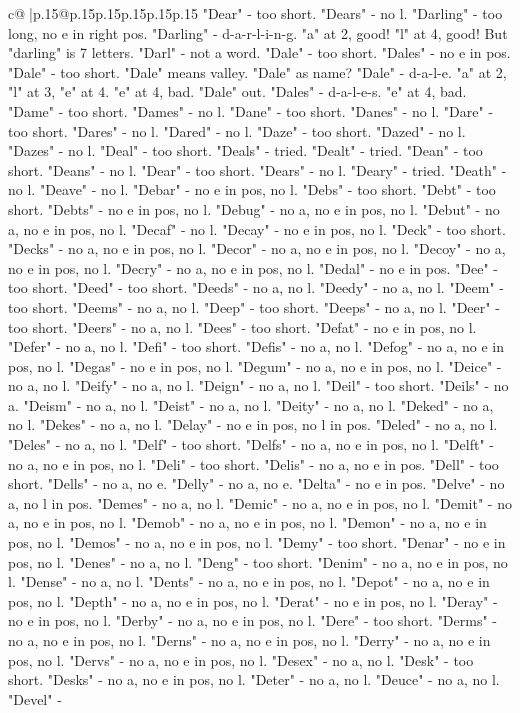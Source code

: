 \documentclass{article}
\begin{document}
{\begin{supertabular}{c@{$\;$}|p{.15\linewidth}@{}p{.15\linewidth}p{.15\linewidth}p{.15\linewidth}p{.15\linewidth}p{.15\linewidth}}
{{{"Dear" {-} too short. "Dears" {-} no l. "Darling" {-} too long, no e in right pos. "Darling" {-} d{-}a{-}r{-}l{-}i{-}n{-}g. "a" at 2, good! "l" at 4, good! But "darling" is 7 letters. "Darl" {-} not a word. "Dale" {-} too short. "Dales" {-} no e in pos. "Dale" {-} too short. "Dale" means valley. "Dale" as name? "Dale" {-} d{-}a{-}l{-}e. "a" at 2, "l" at 3, "e" at 4. "e" at 4, bad. "Dale" out. "Dales" {-} d{-}a{-}l{-}e{-}s. "e" at 4, bad. "Dame" {-} too short. "Dames" {-} no l. "Dane" {-} too short. "Danes" {-} no l. "Dare" {-} too short. "Dares" {-} no l. "Dared" {-} no l. "Daze" {-} too short. "Dazed" {-} no l. "Dazes" {-} no l. "Deal" {-} too short. "Deals" {-} tried. "Dealt" {-} tried. "Dean" {-} too short. "Deans" {-} no l. "Dear" {-} too short. "Dears" {-} no l. "Deary" {-} tried. "Death" {-} no l. "Deave" {-} no l. "Debar" {-} no e in pos, no l. "Debs" {-} too short. "Debt" {-} too short. "Debts" {-} no e in pos, no l. "Debug" {-} no a, no e in pos, no l. "Debut" {-} no a, no e in pos, no l. "Decaf" {-} no l. "Decay" {-} no e in pos, no l. "Deck" {-} too short. "Decks" {-} no a, no e in pos, no l. "Decor" {-} no a, no e in pos, no l. "Decoy" {-} no a, no e in pos, no l. "Decry" {-} no a, no e in pos, no l. "Dedal" {-} no e in pos. "Dee" {-} too short. "Deed" {-} too short. "Deeds" {-} no a, no l. "Deedy" {-} no a, no l. "Deem" {-} too short. "Deems" {-} no a, no l. "Deep" {-} too short. "Deeps" {-} no a, no l. "Deer" {-} too short. "Deers" {-} no a, no l. "Dees" {-} too short. "Defat" {-} no e in pos, no l. "Defer" {-} no a, no l. "Defi" {-} too short. "Defis" {-} no a, no l. "Defog" {-} no a, no e in pos, no l. "Degas" {-} no e in pos, no l. "Degum" {-} no a, no e in pos, no l. "Deice" {-} no a, no l. "Deify" {-} no a, no l. "Deign" {-} no a, no l. "Deil" {-} too short. "Deils" {-} no a. "Deism" {-} no a, no l. "Deist" {-} no a, no l. "Deity" {-} no a, no l. "Deked" {-} no a, no l. "Dekes" {-} no a, no l. "Delay" {-} no e in pos, no l in pos. "Deled" {-} no a, no l. "Deles" {-} no a, no l. "Delf" {-} too short. "Delfs" {-} no a, no e in pos, no l. "Delft" {-} no a, no e in pos, no l. "Deli" {-} too short. "Delis" {-} no a, no e in pos. "Dell" {-} too short. "Dells" {-} no a, no e. "Delly" {-} no a, no e. "Delta" {-} no e in pos. "Delve" {-} no a, no l in pos. "Demes" {-} no a, no l. "Demic" {-} no a, no e in pos, no l. "Demit" {-} no a, no e in pos, no l. "Demob" {-} no a, no e in pos, no l. "Demon" {-} no a, no e in pos, no l. "Demos" {-} no a, no e in pos, no l. "Demy" {-} too short. "Denar" {-} no e in pos, no l. "Denes" {-} no a, no l. "Deng" {-} too short. "Denim" {-} no a, no e in pos, no l. "Dense" {-} no a, no l. "Dents" {-} no a, no e in pos, no l. "Depot" {-} no a, no e in pos, no l. "Depth" {-} no a, no e in pos, no l. "Derat" {-} no e in pos, no l. "Deray" {-} no e in pos, no l. "Derby" {-} no a, no e in pos, no l. "Dere" {-} too short. "Derms" {-} no a, no e in pos, no l. "Derns" {-} no a, no e in pos, no l. "Derry" {-} no a, no e in pos, no l. "Dervs" {-} no a, no e in pos, no l. "Desex" {-} no a, no l. "Desk" {-} too short. "Desks" {-} no a, no e in pos, no l. "Deter" {-} no a, no l. "Deuce" {-} no a, no l. "Devel" {-} }}}
\end{supertabular}}
\end{document}
